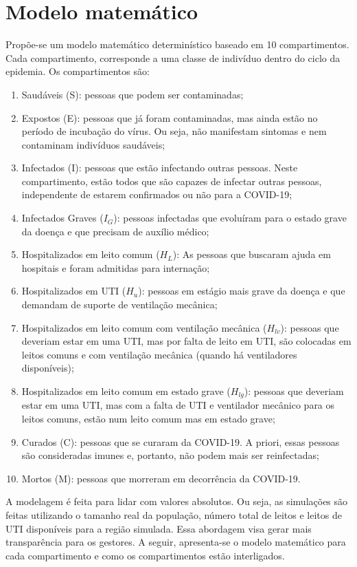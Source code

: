 \documentclass[12pt,a4papper]{article}
\begin{document}
\section{Modelo matemático}

Propõe-se um modelo matemático determinístico baseado em 10 compartimentos.  Cada compartimento, corresponde a uma classe de indivíduo dentro do ciclo da epidemia. Os compartimentos são: 
\begin{enumerate}
    \item Saudáveis (S): pessoas que podem ser contaminadas;
    \item Expostos (E): pessoas que já foram contaminadas, mas ainda estão no período de incubação do vírus. Ou seja, não manifestam sintomas e nem contaminam indivíduos saudáveis;
    \item Infectados (I): pessoas que estão infectando outras pessoas. Neste compartimento, estão todos que são capazes de infectar outras pessoas, independente de estarem confirmados ou não para a COVID-19;
    \item Infectados Graves ($I_G$): pessoas infectadas que evoluíram para o estado grave da doença e que precisam de auxílio médico;
    \item Hospitalizados em leito comum ($H_L$): As pessoas que buscaram ajuda em hospitais e foram admitidas para internação;
    \item Hospitalizados em UTI ($H_u$): pessoas em estágio mais grave da doença e que demandam de suporte de ventilação mecânica;
    \item Hospitalizados em leito comum com ventilação mecânica ($H_{lv}$): pessoas que deveriam estar em uma UTI, mas por falta de leito em UTI, são colocadas em leitos comuns e com ventilação mecânica (quando há ventiladores disponíveis);
    \item Hospitalizados em leito comum em estado grave ($H_{lg}$): pessoas que deveriam estar em uma UTI, mas com a falta de UTI e ventilador mecânico para os leitos comuns, estão num leito comum mas em estado grave;
    \item Curados (C): pessoas que se curaram da COVID-19. A priori, essas pessoas são consideradas imunes e, portanto, não podem mais ser reinfectadas;
    \item Mortos (M): pessoas que morreram em decorrência da COVID-19.
\end{enumerate}

A modelagem é feita para lidar com valores absolutos. Ou seja, as simulações são feitas utilizando o tamanho real da população, número total de leitos e leitos de UTI disponíveis para a região simulada. Essa abordagem visa gerar mais transparência para os gestores. A seguir, apresenta-se o modelo matemático para cada compartimento e como os compartimentos estão interligados.
\end{document}
